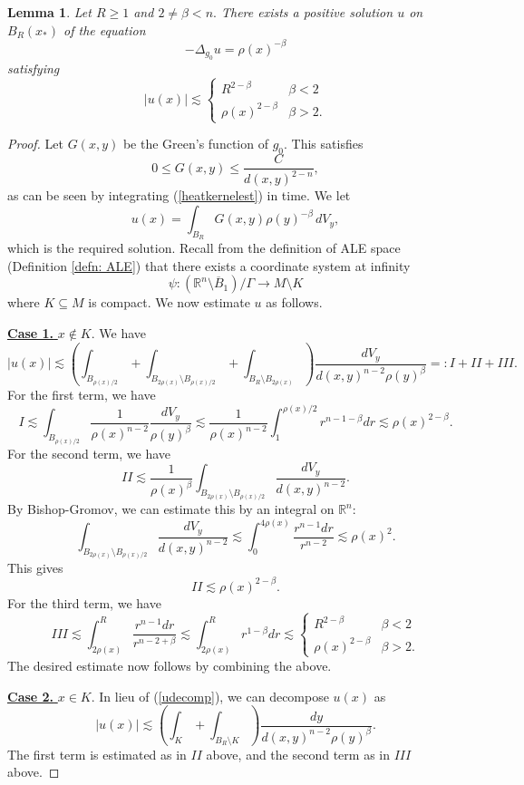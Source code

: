 \documentclass[12pt]{amsart}
\renewcommand{\1}{{\mathbf 1}}
\newcommand{\R}{{\mathbb R}}
\newtheorem{lemma}[thm]{Lemma}
\theoremstyle{others}
\numberwithin{equation}{section}
\begin{document}
\begin{lemma}
Let $R \geq 1$ and $2 \neq \beta < n.$ There exists a positive solution $u$ on $B_R{(x_*)}$ of the equation
$$-\Delta_{g_0} u = \rho(x)^{-\beta}$$
satisfying
$$|u(x)| \lesssim \begin{cases} R^{2 - \beta} & \beta < 2 \\ \rho(x)^{2 - \beta} & \beta > 2. \end{cases}$$
\end{lemma}
\begin{proof}
    Let $G(x,y)$ be the Green's function of $g_0.$ This satisfies
    $$0 \leq G(x,y) \leq \frac{C}{d(x,y)^{2-n}},$$
    as can be seen by integrating (\ref{heatkernelest}) in time. We let
    $$u(x) = \int_{B_R} G(x,y) \rho(y)^{-\beta} \, dV_y,$$
    which is the required solution. 
    Recall from the definition of ALE space (Definition \ref{defn: ALE}) that there exists a coordinate system at infinity
        $$\psi : ( \R^n \setminus \overline B_1 ) / \Gamma \to M \setminus K $$
    where $K \subseteq M$ is compact.
    We now estimate $u$ as follows.

    \vspace{2mm}

   \noindent \underline{{\bf Case 1.} $x \not\in K.$} We have
    \begin{equation}\label{udecomp}
    |u(x)| \lesssim \left( \int_{B_{\rho(x)/2}} + \int_{B_{2\rho(x)} \setminus B_{\rho(x){/2}}} + \int_{B_R \setminus B_{2 \rho(x)} } \right) \frac{dV_y}{d(x,y)^{n-2} \rho(y)^\beta} =: I + II + III.
    \end{equation}
    For the first term, we have
    $$I \lesssim \int_{B_{\rho(x)/2}} \frac{1}{\rho(x)^{n-2}} \frac{dV_y}{\rho(y)^\beta} \lesssim \frac{1}{\rho(x)^{n-2}} \int_{1}^{\rho(x)/2} r^{n-1 - \beta} dr \lesssim \rho(x)^{2 - \beta}.$$
    For the second term, we have
    $$II \lesssim \frac{1}{\rho(x)^\beta} \int_{B_{2\rho(x)} \setminus B_{\rho(x){/2}}} \frac{dV_y}{d(x,y)^{n-2}}.$$
    By Bishop-Gromov, we can estimate this by an integral on $\R^n:$
    $$\int_{B_{2\rho(x)} \setminus B_{\rho(x){/2}}} \frac{dV_y}{d(x,y)^{n-2}} \lesssim \int_{0}^{4 \rho(x)} \frac{r^{n-1} dr}{r^{n-2}} \lesssim \rho(x)^2.$$
    This gives
    $$II \lesssim \rho(x)^{2 - \beta}.$$
    For the third term, we have
    $$III \lesssim \int_{2\rho(x)}^R \frac{r^{n-1} dr}{r^{n - 2 + \beta}} \lesssim \int_{2\rho(x)}^R r^{1 - \beta} dr \lesssim \begin{cases} R^{2 - \beta} & \beta < 2 \\ \rho(x)^{2 - \beta} & \beta > 2. \end{cases}$$
    The desired estimate now follows by combining the above.

\vspace{2mm}
    
    \noindent \underline{{\bf Case 2.} $x \in K.$} In lieu of (\ref{udecomp}), we can decompose $u(x)$ as
        \begin{equation*}
    |u(x)| \lesssim \left( \int_{K} + \int_{B_R \setminus K } \right) \frac{dy}{d(x,y)^{n-2} \rho(y)^\beta}.
    \end{equation*}
    The first term is estimated as in $II$ above, and the second term as in $III$ above.
\end{proof}
\end{document}

